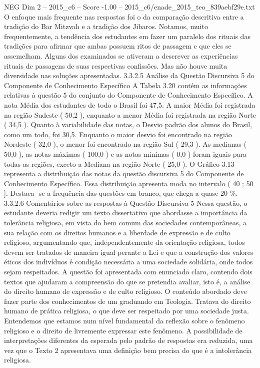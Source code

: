 \begin{textsample}{NEG Dim 2 – 2015\_c6 – Score -1.00 – 2015\_c6/enade\_2015\_teo\_839aebf29e.txt}
O enfoque mais frequente nas respostas foi o da comparação descritiva entre a tradição do Bar Mitzvah e a tradição dos Jibaros.
Notamos, muito frequentemente, a tendência dos estudantes em fazer um paralelo dos rituais das tradições para afirmar que ambas possuem ritos de passagem e que eles se assemelham.
Alguns dos examinados se ativeram a descrever as experiências rituais de passagens de suas respectivas confissões.
Mas não houve muita diversidade nas soluções apresentadas. 3.3.2.5 Análise da Questão Discursiva 5 do Componente de Conhecimento Específico A Tabela 3.20 contém as informações relativas à questão 5 do conjunto do Componente de Conhecimento Específico.
A nota Média dos estudantes de todo o Brasil foi 47,5.
A maior Média foi registrada na região Sudeste ( 50,2 ), enquanto a menor Média foi registrada na região Norte ( 34,5 ).
Quanto à variabilidade das notas, o Desvio padrão dos alunos do Brasil, como um todo, foi 30,5.
Enquanto o maior desvio foi encontrado na região Nordeste ( 32,0 ), o menor foi encontrado na região Sul ( 29,3 ).
As medianas ( 50,0 ), as notas máximas ( 100,0 ) e as notas mínimas ( 0,0 ) foram iguais para todas as regiões, exceto a Mediana na região Norte ( 25,0 ).
O Gráfico 3.13 representa a distribuição das notas da questão discursiva 5 do Componente de Conhecimento Específico.
Essa distribuição apresenta moda no intervalo ( 40 ; 50 ].
Destaca -se a frequência das questões em branco, que chega a quase 20 \%. 3.3.2.6 Comentários sobre as respostas à Questão Discursiva 5 Nessa questão, o estudante deveria redigir um texto dissertativo que abordasse a importância da tolerância religiosa, em vista do bem comum das sociedades contemporâneas, a sua relação com os direitos humanos e a liberdade de expressão e de culto religioso, argumentando que, independentemente da orientação religiosa, todos devem ser tratados de maneira igual perante a Lei e que a construção dos valores éticos dos indivíduos é condição necessária a uma sociedade solidária, onde todos sejam respeitados.
A questão foi apresentada com enunciado claro, contendo dois textos que ajudaram a compreensão do que se pretendia avaliar, isto é, a análise do direito humano de expressão e de culto religioso.
O conteúdo abordado deve fazer parte dos conhecimentos de um graduando em Teologia.
Tratava do direito humano de prática religiosa, o que deve ser respeitado por uma sociedade justa.
Entendemos que estamos num nível fundamental da reflexão sobre o fenômeno religioso e o direito de livremente expressar este fenômeno.
A possibilidade de interpretações diferentes da esperada pelo padrão de respostas era reduzida, uma vez que o Texto 2 apresentava uma definição bem precisa do que é a intolerância religiosa.

\end{textsample}
